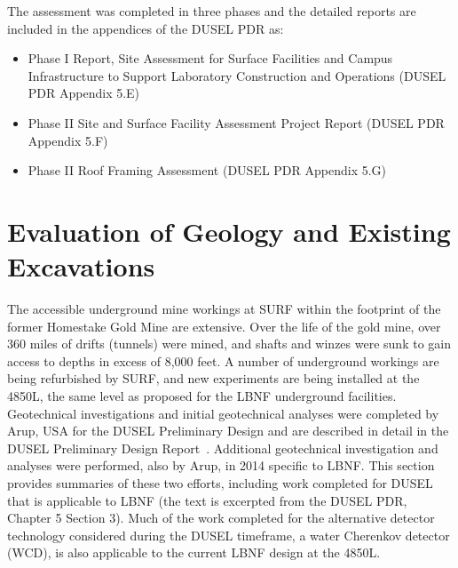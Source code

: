 The assessment %
was completed in three phases and the detailed reports are included in the appendices of the DUSEL PDR as:

\begin{itemize}
 \item Phase I Report, Site Assessment for Surface Facilities and Campus Infrastructure to Support Laboratory Construction and Operations (DUSEL PDR Appendix 5.E)
 \item Phase II Site and Surface Facility Assessment Project Report (DUSEL PDR Appendix 5.F)
 \item Phase II Roof Framing Assessment (DUSEL PDR Appendix 5.G)
     \end{itemize}


\section{Evaluation of Geology and Existing Excavations}
\label{sec:fscf-site-cond-geo}

The accessible underground mine workings at SURF within the footprint of the former Homestake Gold Mine are extensive.  %
Over the life of the gold mine, over 360 miles of drifts (tunnels) were mined, and shafts and winzes were sunk to gain access to depths in excess of 8,000 feet. A number of underground workings are being refurbished by SURF, and new experiments are being installed %
at the 4850L, the same level as proposed for the LBNF underground facilities. Geotechnical investigations and initial geotechnical analyses were completed by Arup, USA  for the DUSEL Preliminary Design and are described in detail in the DUSEL Preliminary Design Report~\cite{lachel-geotech, dusel-pdr}. Additional geotechnical investigation and analyses were performed, also by Arup, in 2014 specific to LBNF.  This section provides summaries of these two efforts, including work completed for DUSEL that is applicable to LBNF (the text is excerpted from the DUSEL PDR, Chapter 5 Section 3). Much of the work completed for the alternative detector technology considered during the DUSEL timeframe, a water Cherenkov detector (WCD), is also applicable to the current LBNF design at the 4850L.  


